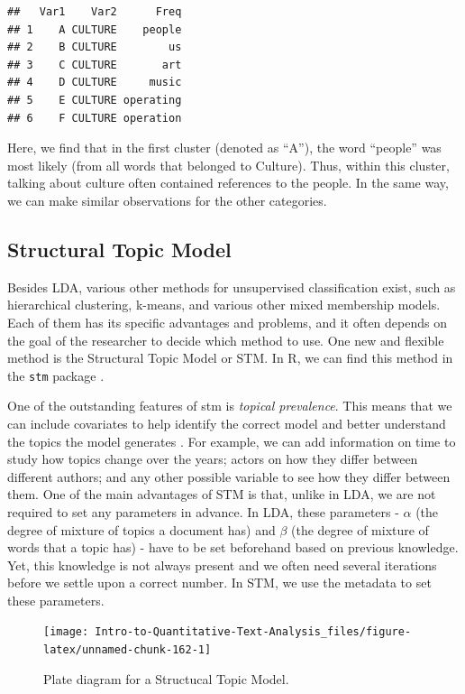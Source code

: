 \documentclass[
]{article}
\begin{document}
\begin{verbatim}
##   Var1    Var2      Freq
## 1    A CULTURE    people
## 2    B CULTURE        us
## 3    C CULTURE       art
## 4    D CULTURE     music
## 5    E CULTURE operating
## 6    F CULTURE operation
\end{verbatim}

Here, we find that in the first cluster (denoted as ``A''), the word ``people'' was most likely (from all words that belonged to Culture). Thus, within this cluster, talking about culture often contained references to the people. In the same way, we can make similar observations for the other categories.

\hypertarget{structural-topic-model}{%
\subsection{Structural Topic Model}\label{structural-topic-model}}

Besides LDA, various other methods for unsupervised classification exist, such as hierarchical clustering, k-means, and various other mixed membership models. Each of them has its specific advantages and problems, and it often depends on the goal of the researcher to decide which method to use. One new and flexible method is the Structural Topic Model or STM. In R, we can find this method in the \texttt{stm} package \autocite{Roberts2019a}.

One of the outstanding features of stm is \emph{topical prevalence}. This means that we can include covariates to help identify the correct model and better understand the topics the model generates \autocite{Roberts2014a}. For example, we can add information on time to study how topics change over the years; actors on how they differ between different authors; and any other possible variable to see how they differ between them. One of the main advantages of STM is that, unlike in LDA, we are not required to set any parameters in advance. In LDA, these parameters - \(\alpha\) (the degree of mixture of topics a document has) and \(\beta\) (the degree of mixture of words that a topic has) - have to be set beforehand based on previous knowledge. Yet, this knowledge is not always present and we often need several iterations before we settle upon a correct number. In STM, we use the metadata to set these parameters.

\begin{figure}
\texttt{[image: Intro-to-Quantitative-Text-Analysis\_files/figure-latex/unnamed-chunk-162-1]} \caption{Plate diagram for a Structucal Topic Model.}\label{fig:unnamed-chunk-162}
\end{figure}
\end{document}
